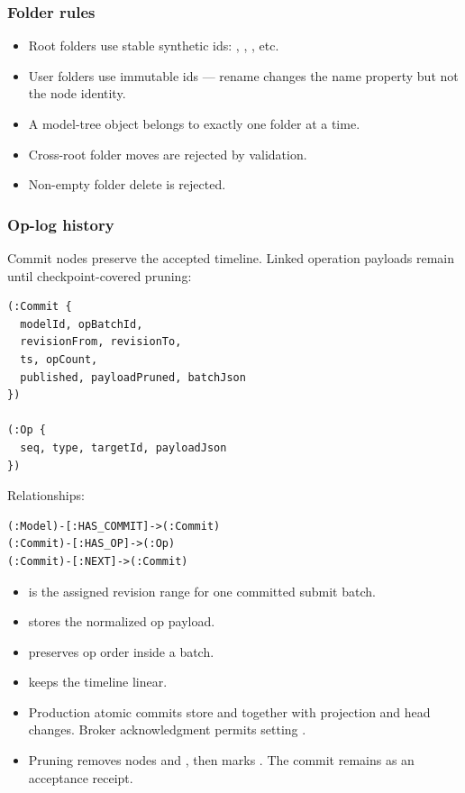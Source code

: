 \subsubsection{Folder rules}

\begin{itemize}
\item Root folders use stable synthetic ids:
  , ,
  , etc.
\item User folders use immutable ids --- rename changes the name property
  but not the node identity.
\item A model-tree object belongs to exactly one folder at a time.
\item Cross-root folder moves are rejected by validation.
\item Non-empty folder delete is rejected.
\end{itemize}

\subsubsection{Op-log history}

Commit nodes preserve the accepted timeline. Linked operation payloads remain
until checkpoint-covered pruning:

\begin{lstlisting}[caption={Op-log nodes}]
(:Commit {
  modelId, opBatchId,
  revisionFrom, revisionTo,
  ts, opCount,
  published, payloadPruned, batchJson
})

(:Op {
  seq, type, targetId, payloadJson
})
\end{lstlisting}

Relationships:

\begin{lstlisting}[caption={Op-log relationships}]
(:Model)-[:HAS_COMMIT]->(:Commit)
(:Commit)-[:HAS_OP]->(:Op)
(:Commit)-[:NEXT]->(:Commit)
\end{lstlisting}

\begin{itemize}
\item {} is the assigned revision range for
  one committed submit batch.
\item {} stores the normalized op payload.
\item {} preserves op order inside a batch.
\item {} keeps the timeline linear.
\item Production atomic commits store  and
   together with projection and head changes.
  Broker acknowledgment permits setting .
\item Pruning removes  nodes and , then marks
  . The commit remains as an acceptance receipt.
\end{itemize}

